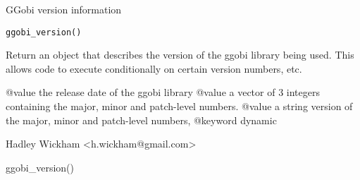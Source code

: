 \documentclass{article}
\begin{document}
\begin{Description}\relax
GGobi version information
\end{Description}
\begin{Usage}
\begin{verbatim}ggobi_version()\end{verbatim}
\end{Usage}
\begin{Arguments}
\end{Arguments}
\begin{Details}\relax
Return an object that describes the version of the ggobi
library being used. This allows code to execute
conditionally on certain version numbers, etc.

@value the release date of the ggobi library
@value a vector of 3 integers containing the major, minor and patch-level numbers.
@value a string version of the major, minor and patch-level numbers,
@keyword dynamic
\end{Details}
\begin{Value}
\begin{ldescription}
\item[\code{the release date of the ggobi library}] 
\item[\code{a vector of 3 integers containing the major, minor and patch-level numbers.}] 
\item[\code{a string version of the major, minor and patch-level numbers,}] 
\end{ldescription}
\end{Value}
\begin{Author}\relax
Hadley Wickham <h.wickham@gmail.com>
\end{Author}
\begin{Examples}
\begin{ExampleCode}ggobi_version()\end{ExampleCode}
\end{Examples}
\end{document}

